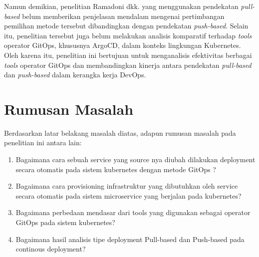 Namun demikian, penelitian Ramadoni dkk. \cite{Ramadoni2021} yang menggunakan pendekatan
\textit{pull-based} belum memberikan penjelasan mendalam mengenai pertimbangan
pemilihan metode tersebut dibandingkan dengan pendekatan \textit{push-based}.
Selain itu, penelitian tersebut juga belum melakukan analisis komparatif terhadap
\textit{tools} operator GitOps, khususnya ArgoCD, dalam konteks lingkungan Kubernetes.
Oleh karena itu, penelitian ini bertujuan untuk menganalisis efektivitas berbagai
\textit{tools} operator GitOps dan membandingkan kinerja antara pendekatan
\textit{pull-based} dan \textit{push-based} dalam kerangka kerja DevOps.
\vspace{0.5cm}
\section{Rumusan Masalah}
Berdasarkan latar belakang masalah diatas, adapun rumusan masalah pada penelitian ini antara lain:
\begin{enumerate}[label=\alph*.]
    \item Bagaimana cara sebuah service yang source nya diubah dilakukan  deployment secara otomatis pada sistem kubernetes dengan metode GitOps ?
    \item Bagaimana cara provisioning infrastruktur yang dibutuhkan oleh service  secara otomatis pada sistem microservice yang berjalan pada kubernetes?
    \item Bagaimana perbedaan mendasar dari tools yang digunakan sebagai operator GitOps pada sistem kubernetes?
    \item Bagaimana hasil analisis tipe deployment Pull-based dan Push-based pada continous deployment?
\end{enumerate}

\vspace{0.5cm}

